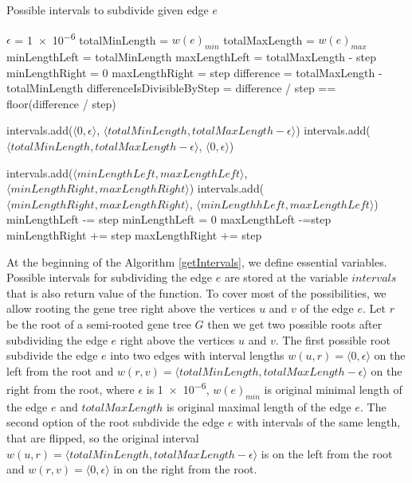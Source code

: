 \begin{algorithm}
\caption{Possible intervals to subdivide given edge $e$} 
\label{getIntervals}
\begin{algorithmic}[1]
	\State $\epsilon$ = \num{1e-6}
	\State totalMinLength = $w(e)_{min}$
	\State totalMaxLength = $w(e)_{max}$
	\State minLengthLeft = totalMinLength
	\State maxLengthLeft = totalMaxLength - step
	\State minLengthRight = 0
	\State maxLengthRight = step
	\State difference = totalMaxLength - totalMinLength
	\State differenceIsDivisibleByStep = difference / step == floor(difference / step)
	
	\State intervals.add($\langle 0, \epsilon \rangle$, $\langle totalMinLength, totalMaxLength-\epsilon \rangle$) 
	\State intervals.add($\langle totalMinLength, totalMaxLength-\epsilon \rangle$, $\langle 0, \epsilon \rangle$)
	
		\State intervals.add($\langle minLengthLeft, maxLengthLeft \rangle$, $\langle minLengthRight, maxLengthRight \rangle$)
			\State intervals.add($\langle minLengthRight, maxLengthRight \rangle$, $\langle minLengthhLeft, maxLengthLeft \rangle$)
		\EndIf
		\State minLengthLeft -= step
			\State minLengthLeft = 0
		\EndIf
		\State maxLengthLeft -=step
		\State minLengthRight += step
		\State maxLengthRight += step
	\EndWhile
\EndFunction
\end{algorithmic}
\end{algorithm}

At the beginning of the Algorithm \ref{getIntervals}, we define essential variables. Possible intervals for subdividing the edge $e$ are stored at the variable $intervals$ that is also return value of the function. To cover most of the possibilities, we allow rooting the gene tree right above the vertices $u$ and $v$ of the edge $e$. Let $r$ be the root of a semi-rooted gene tree $G$ then we get two possible roots after subdividing the edge $e$ right above the vertices $u$ and $v$. The first possible root subdivide the edge $e$ into two edges with interval lengths $w(u, r) = \langle 0, \epsilon \rangle$ on the left from the root and $w(r, v) = \langle totalMinLength, totalMaxLength-\epsilon \rangle$ on the right from the root, where $\epsilon$ is \num{1e-6}, $w(e)_{min}$ is original minimal length of the edge $e$ and $totalMaxLength$ is original maximal length of the edge $e$. The second option of the root subdivide the edge $e$ with intervals of the same length, that are flipped, so the original interval $w(u, r) = \langle totalMinLength, totalMaxLength-\epsilon \rangle$ is on the left from the root  and $w(r, v) = \langle 0, \epsilon \rangle$ in on the right from the root.


